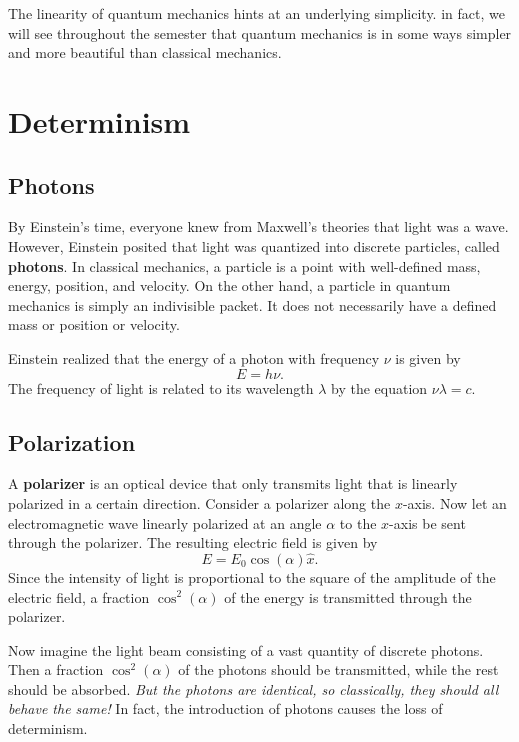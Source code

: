     \begin{framedrmk*}[Simplicity]
        The linearity of quantum mechanics hints at an underlying simplicity. in fact, we will see throughout the semester that quantum mechanics is in some ways simpler and more beautiful than classical mechanics.
    \end{framedrmk*} 

    \section{Determinism}
    \label{determinism}
    \subsection{Photons}\label{photons}
      By Einstein's time, everyone knew from Maxwell's theories that light was a wave. However, Einstein posited that light was quantized into discrete particles, called \textbf{photons}. In classical mechanics, a particle is a point with well-defined mass, energy, position, and velocity. On the other hand, a particle in quantum mechanics is simply an indivisible packet. It does not necessarily have a defined mass or position or velocity.
    
    Einstein realized that the energy of a photon with frequency $\nu$ is given by $$E=h\nu.$$The frequency of light is related to its wavelength $\lambda$ by the equation $\nu\lambda=c$.
    
    \subsection{Polarization}\label{polar}
    
    A \textbf{polarizer} is an optical device that only transmits light that is linearly polarized in a certain direction. Consider a polarizer along the $x$-axis. Now let an electromagnetic wave linearly polarized at an angle $\alpha$ to the $x$-axis be sent through the polarizer. The resulting electric field is given by $$E=E_0\cos(\alpha)\hat{x}.$$Since the intensity of light is proportional to the square of the amplitude of the electric field, a fraction $\cos^2(\alpha)$ of the energy is transmitted through the polarizer.
    
    Now imagine the light beam consisting of a vast quantity of discrete photons. Then a fraction $\cos^2(\alpha)$ of the photons should be transmitted, while the rest should be absorbed. \textit{But the photons are identical, so classically, they should all behave the same!} In fact, the introduction of photons causes the loss of determinism.
    
